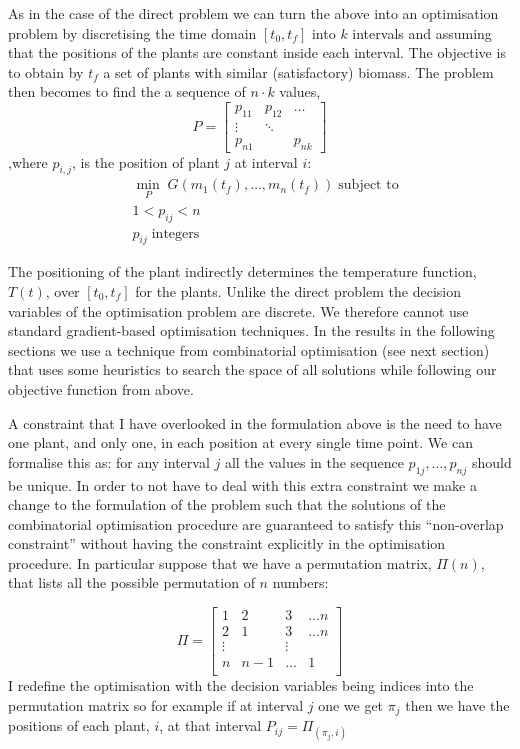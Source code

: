 As in the case of the direct problem we can turn the above into an optimisation
problem by discretising the time domain $[t_0, t_f]$ into $k$ intervals and
assuming that the positions of the plants are constant inside each interval. The
objective is to obtain by $t_f$ a set of plants with similar (satisfactory)
biomass. The problem then becomes to find the a sequence of $n \cdot k$ values,
$$
P = \begin{bmatrix} 
    p_{11} & p_{12} & \dots \\
    \vdots & \ddots & \\
    p_{n1} &        & p_{nk} 
    \end{bmatrix}
$$
,where $p_{i, j}$, is the position of plant $j$ at interval $i$:
\begin{align*}
& \min_{P} \; G(m_1(t_f), \dots, m_n(t_f)) \; \text{subject to} \\
& 1 < p_{ij} < n \\
& p_{ij} \; \text{integers}
\end{align*}

The positioning of the plant indirectly determines the temperature function,
$T(t)$, over $[t_0, t_f]$ for the plants. Unlike the direct problem the decision
variables of the optimisation problem are discrete. We therefore cannot use
standard gradient-based optimisation techniques. In the results in the following
sections we use a technique from combinatorial optimisation (see next section)
that uses some heuristics to search the space of all solutions while following
our objective function from above.

A constraint that I have overlooked in the formulation above is the need to
have one plant, and only one, in each position at every single time point. We
can formalise this as: for any interval $j$ all the values in the sequence
$p_{1j}, \dots, p_{nj}$ should be unique. In order to not have to deal with this
extra constraint we make a change to the formulation of the problem such that
the solutions of the combinatorial optimisation procedure are guaranteed to
satisfy this ``non-overlap constraint'' without having the constraint explicitly
in the optimisation procedure. In particular suppose that we have a permutation
matrix, $\Pi(n)$, that lists all the possible permutation of $n$ numbers:

$$
\Pi = \begin{bmatrix} 
    1 & 2 & 3 & \dots n \\
    2 & 1 & 3 & \dots n \\
    \vdots &  & \vdots \\
    n &  n-1 & \dots  &  1 \\
    \end{bmatrix}
$$
I redefine the optimisation with the decision variables being indices into the
permutation matrix so for example if at interval $j$ one we get $\pi_j$ then we
have the positions of each plant, $i$, at that interval $P_{ij} = \Pi_{(\pi_j, i)}$

